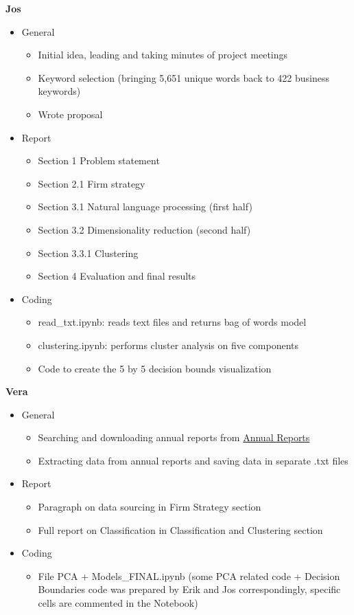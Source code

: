 \documentclass{article}
\begin{document}
\vspace{5mm}
\textbf{Jos}
\begin{itemize}
    \item General
    \begin{itemize}
        \item Initial idea, leading and taking minutes of project meetings 
        \item Keyword selection (bringing 5,651 unique words back to 422 business keywords)
        \item Wrote proposal
    \end{itemize}
    \item Report
    \begin{itemize}
        \item Section 1 Problem statement
        \item Section 2.1 Firm strategy
        \item Section 3.1 Natural language processing (first half)
        \item Section 3.2 Dimensionality reduction (second half)
        \item Section 3.3.1 Clustering
        \item Section 4 Evaluation and final results
    \end{itemize}
    \item Coding
    \begin{itemize}
        \item read\_txt.ipynb: reads text files and returns bag of words model
        \item clustering.ipynb: performs cluster analysis on five components
        \item Code to create the 5 by 5 decision bounds visualization
    \end{itemize}
\end{itemize}

\vspace{5mm}
\textbf{Vera}
\begin{itemize}
    \item General
    \begin{itemize}
        \item Searching and downloading annual reports from \href{https://www.annualreports.com/}{Annual Reports}
        \item Extracting data from annual reports and saving data in separate .txt files
    \end{itemize}
    \item Report
    \begin{itemize}
        \item Paragraph on data sourcing in Firm Strategy section 
        \item Full report on Classification in Classification and Clustering section
    \end{itemize}
    \item Coding
    \begin{itemize}
        \item File PCA + Models\_FINAL.ipynb (some PCA related code + Decision Boundaries code was prepared by Erik and Jos correspondingly, specific cells are commented in the Notebook) 
    \end{itemize}
\end{itemize}
\end{document}
